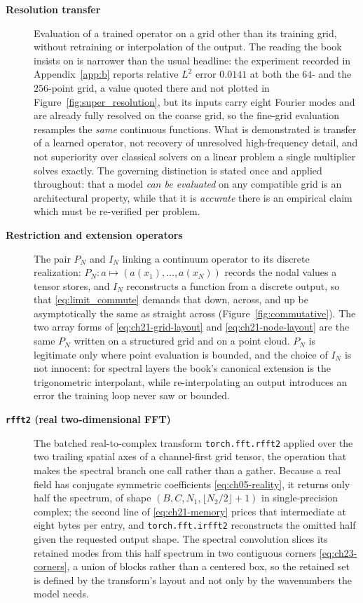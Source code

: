 \begin{description}
\item[\textbf{Resolution transfer}] Evaluation of a trained operator on a grid other than
its training grid, without retraining or interpolation of the output. The reading the book
insists on is narrower than the usual headline: the experiment recorded in
Appendix~\ref{app:b} reports relative $L^{2}$ error $0.0141$ at both the $64$- and the
$256$-point grid, a value quoted there and not plotted in
Figure~\ref{fig:super_resolution}, but its inputs carry eight Fourier modes and are already fully
resolved on the coarse grid, so the fine-grid evaluation resamples the \emph{same}
continuous functions. What is demonstrated is transfer of a learned operator, not recovery
of unresolved high-frequency detail, and not superiority over classical solvers on a linear
problem a single multiplier solves exactly. The governing distinction is stated once and
applied throughout: that a model \emph{can be evaluated} on any compatible grid is an
architectural property, while that it is \emph{accurate} there is an empirical claim which
must be re-verified per problem. 

\item[\textbf{Restriction and extension operators}] The pair $P_{N}$ and $I_{N}$ linking a
continuum operator to its discrete realization: $P_{N} : a \mapsto (a(x_{1}), \dots,
a(x_{N}))$ records the nodal values a tensor stores, and $I_{N}$ reconstructs a function
from a discrete output, so that \eqref{eq:limit_commute} demands that down, across, and up
be asymptotically the same as straight across (Figure~\ref{fig:commutative}). The two array
forms of \eqref{eq:ch21-grid-layout} and \eqref{eq:ch21-node-layout} are the same $P_{N}$
written on a structured grid and on a point cloud. $P_{N}$ is legitimate only where point
evaluation is bounded, and the choice of $I_{N}$ is not innocent: for spectral layers the
book's canonical extension is the trigonometric interpolant, while re-interpolating an
output introduces an error the training loop never saw or bounded.

\item[\textbf{\texttt{rfft2} (real two-dimensional FFT)}] The batched real-to-complex
transform \texttt{torch.fft.\allowbreak rfft2} applied over the two trailing spatial axes of a
channel-first grid tensor, the operation that makes the spectral branch one call rather
than a gather. Because a real field has conjugate symmetric coefficients
\eqref{eq:ch05-reality}, it returns only half the spectrum, of shape
$(B, C, N_{1}, \lfloor N_{2}/2 \rfloor + 1)$ in single-precision complex; the second line
of \eqref{eq:ch21-memory} prices that intermediate at eight bytes per entry, and
\texttt{torch.fft.\allowbreak irfft2} reconstructs the omitted half given the requested
output shape.
The spectral convolution slices its retained modes from this half spectrum in two
contiguous corners \eqref{eq:ch23-corners}, a union of blocks rather than a centered box,
so the retained set is defined by the transform's layout and not only by the wavenumbers
the model needs.


\end{description}
